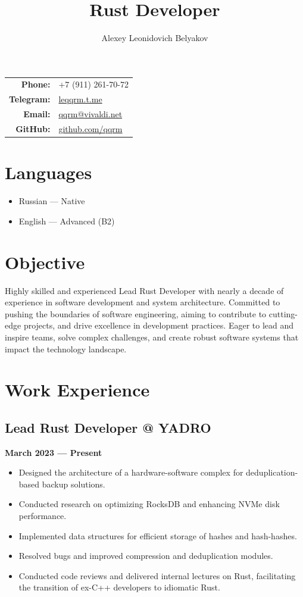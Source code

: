 \documentclass[a4paper,12pt]{article}
\title{\textbf{Rust Developer}}
\author{Alexey Leonidovich Belyakov}
\begin{document}
\maketitle

\begin{center}
    \begin{tabular}{rl}
        \textbf{Phone:} & +7 (911) 261-70-72 \\
        \textbf{Telegram:} & \href{https://leqqrm.t.me}{leqqrm.t.me} \\
        \textbf{Email:} & \href{mailto:qqrm@vivaldi.net}{qqrm@vivaldi.net} \\
        \textbf{GitHub:} & \href{https://github.com/qqrm}{github.com/qqrm} \\
    \end{tabular}
\end{center}

\section*{Languages}
\begin{itemize}
    \item Russian — Native
    \item English — Advanced (B2)
\end{itemize}

\section*{Objective}
Highly skilled and experienced Lead Rust Developer with nearly a decade of experience in software development and system architecture. Committed to pushing the boundaries of software engineering, aiming to contribute to cutting-edge projects, and drive excellence in development practices. Eager to lead and inspire teams, solve complex challenges, and create robust software systems that impact the technology landscape.

\section*{Work Experience}

\subsection*{Lead Rust Developer @ YADRO}
\textbf{March 2023 — Present}
\begin{itemize}
    \item Designed the architecture of a hardware-software complex for deduplication-based backup solutions.
    \item Conducted research on optimizing RocksDB and enhancing NVMe disk performance.
    \item Implemented data structures for efficient storage of hashes and hash-hashes.
    \item Resolved bugs and improved compression and deduplication modules.
    \item Conducted code reviews and delivered internal lectures on Rust, facilitating the transition of ex-C++ developers to idiomatic Rust.
\end{itemize}
\end{document}
